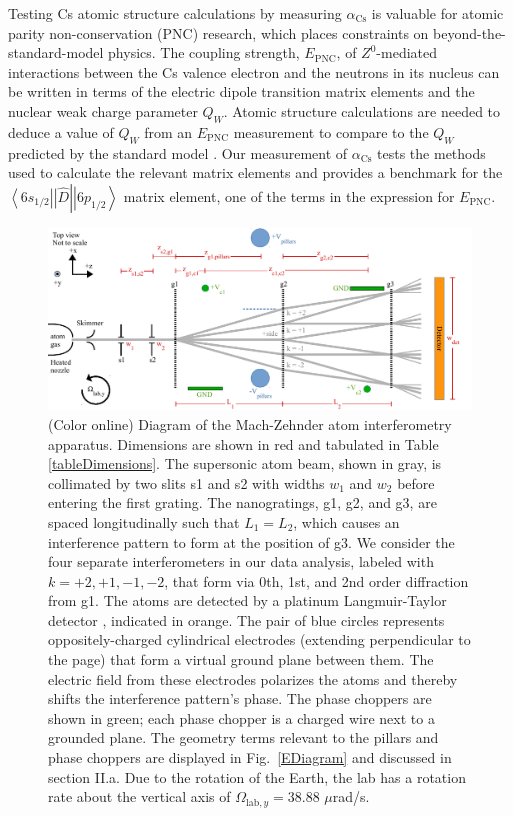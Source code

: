 \documentclass[twocolumn,prl,showpacs,superscriptaddress]{revtex4-1}   %
\newcommand{\brakett}[3]{\left.\left\langle #1 \right|\right|#2\left|\left| #3 \right\rangle\right.}
\newcommand{\figref}[1]{Fig.~\ref{#1}}
\newcommand{\acs}{\alpha_{\textrm{Cs}}}
\newcommand{\Omegalab}{\Omega_{\mathrm{lab},y}}
\begin{document}
Testing Cs atomic structure calculations by measuring $\acs$ is valuable for atomic parity non-conservation (PNC) research, which places constraints on beyond-the-standard-model physics. The coupling strength, $E_{\mathrm{PNC}}$, of $Z^0$-mediated interactions between the Cs valence electron and the neutrons in its nucleus can be written in terms of the electric dipole transition matrix elements and the nuclear weak charge parameter $Q_W$. Atomic structure calculations are needed to deduce a value of $Q_W$ from an $E_{\mathrm{PNC}}$ measurement \cite{Cho1997} to compare to the $Q_W$ predicted by the standard model \cite{Bouchiat1999,Dzuba2012}. Our measurement of $\acs$ tests the methods used to calculate the relevant matrix elements and provides a benchmark for the $\brakett{6s_{1/2}}{\hat{D}}{6p_{1/2}}$ matrix element, one of the terms in the expression for $E_{\mathrm{PNC}}$.

\begin{figure}
\includegraphics[width=\linewidth,keepaspectratio]{IFM_diagram2.pdf}
\caption{\label{IFMDiagram}(Color online) Diagram of the Mach-Zehnder atom interferometry apparatus. Dimensions are shown in red and tabulated in Table \ref{tableDimensions}.  The supersonic atom beam, shown in gray, is collimated by two slits s1 and s2 with widths $w_1$ and $w_2$ before entering the first grating. 
The nanogratings, g1, g2, and g3, are spaced longitudinally such that $L_1 = L_2$, which causes an interference pattern to form at the position of g3.
We consider the four separate interferometers in our data analysis, labeled with $k=+2,+1,-1,-2$, that form via 0th, 1st, and 2nd order diffraction from g1.
The atoms are detected by a platinum Langmuir-Taylor detector \cite{Delhuille2002}, indicated in orange.
The pair of blue circles represents oppositely-charged cylindrical electrodes (extending perpendicular to the page) that form a virtual ground plane between them. The electric field from these electrodes polarizes the atoms and thereby shifts the interference pattern's phase. 
The phase choppers are shown in green; each phase chopper is a charged wire next to a grounded plane. The geometry terms relevant to the pillars and phase choppers are displayed in \figref{EDiagram} and discussed in section II.a.
Due to the rotation of the Earth, the lab has a rotation rate about the vertical axis of $\Omegalab = 38.88$ $\mu$rad/s.  }
\end{figure}
\end{document}
